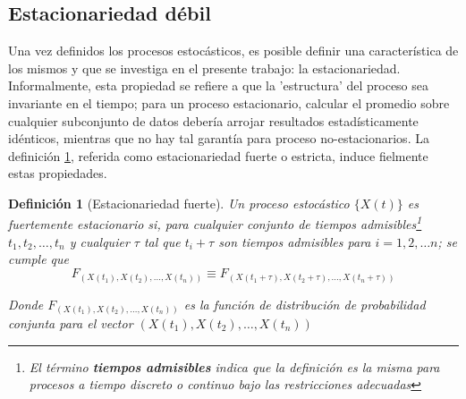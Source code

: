 \documentclass[12pt,a4paper]{mitthesis}
\newtheorem{defn}{Definici\'on}
\begin{document}
\subsection{Estacionariedad d\'ebil}

Una vez definidos los procesos estoc\'asticos, es posible definir una caracter\'istica de los
mismos y que se investiga en el presente trabajo: la estacionariedad.
Informalmente, esta propiedad se refiere a que la 'estructura' del proceso sea invariante en el
tiempo; para un proceso estacionario, calcular el promedio sobre cualquier subconjunto de datos 
deber\'ia arrojar resultados estad\'isticamente id\'enticos, mientras que no hay tal garant\'ia
para proceso no-estacionarios.
La definici\'on \ref{est_fuerte}, referida como estacionariedad fuerte o estricta, 
induce fielmente estas propiedades.

\begin{defn}[Estacionariedad fuerte]
Un proceso estoc\'astico $\{ X(t) \}$ es fuertemente estacionario si, para cualquier conjunto de 
tiempos admisibles\footnote{El t\'ermino \textbf{tiempos admisibles} indica que la definici\'on 
es la misma para procesos a tiempo discreto o continuo bajo las restricciones adecuadas} 
$t_1,t_2,\dots,t_n$ y cualquier $\tau$ tal que $t_i+\tau$ son tiempos admisibles 
para $i = 1, 2, \dots n$; se cumple que
\begin{equation*}
F_{\left(X(t_1),X(t_2),\dots,X(t_n)\right) }
\equiv
F_{\left(X(t_1+\tau),X(t_2+\tau),\dots,X(t_n+\tau)\right)}
\end{equation*}

Donde $F_{\left(X(t_1),X(t_2),\dots,X(t_n)\right) }$ es la funci\'on de distribuci\'on de 
probabilidad conjunta para el vector $\left(X(t_1),X(t_2),\dots,X(t_n)\right)$
\label{est_fuerte}
\end{defn}
\end{document}
